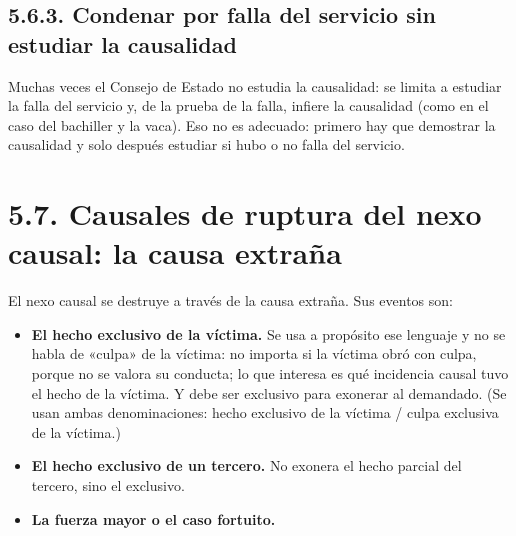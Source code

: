 \subsection{5.6.3. Condenar por falla del servicio sin estudiar la causalidad}
Muchas veces el Consejo de Estado no estudia la causalidad: se limita a estudiar la falla del servicio y, de la prueba de la falla, infiere la causalidad (como en el caso del bachiller y la vaca). Eso no es adecuado: primero hay que demostrar la causalidad y solo después estudiar si hubo o no falla del servicio.

\section{5.7. Causales de ruptura del nexo causal: la causa extraña}
El nexo causal se destruye a través de la causa extraña. Sus eventos son:

\begin{itemize}
\item \textbf{El hecho exclusivo de la víctima.} Se usa a propósito ese lenguaje y no se habla de «culpa» de la víctima: no importa si la víctima obró con culpa, porque no se valora su conducta; lo que interesa es qué incidencia causal tuvo el hecho de la víctima. Y debe ser exclusivo para exonerar al demandado. (Se usan ambas denominaciones: hecho exclusivo de la víctima / culpa exclusiva de la víctima.)
\item \textbf{El hecho exclusivo de un tercero.} No exonera el hecho parcial del tercero, sino el exclusivo.
\item \textbf{La fuerza mayor o el caso fortuito.}
\end{itemize}

